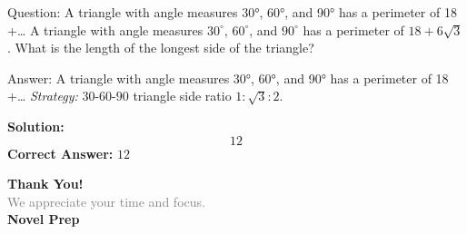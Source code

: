 \documentclass{beamer}
\begin{document}
\begin{frame}{Question: A triangle with angle measures 30°, 60°, and 90° has a perimeter of 18 +…}
A triangle with angle measures $30^\circ$, $60^\circ$, and $90^\circ$ has a perimeter of $18 + 6\sqrt{3}$. What is the length of the longest side of the triangle?
\end{frame}
\begin{frame}{Answer: A triangle with angle measures 30°, 60°, and 90° has a perimeter of 18 +…}
\textit{Strategy:} $30$-$60$-$90$ triangle side ratio $1:\sqrt{3}:2$.

\textbf{Solution:}
\[ \boxed{12} \]
\textbf{Correct Answer:} \( \boxed{12} \)

\end{frame}

\begin{frame}{}
    \centering
    \vspace{5em}
    {\Huge \textbf{\textcolor{novelPurple}{Thank You!}}} \\[1em]
    {\large \textcolor{gray}{We appreciate your time and focus.}} \\[3em]
    {\LARGE \textbf{\textcolor{novelPurple}{\textsf{Novel Prep}}}}
    \vfill
\end{frame}
\end{document}
